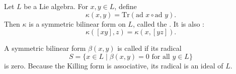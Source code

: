 Let $L$ be a Lie algebra. For $x, y \in L$, define
$$\kappa(x, y) = \text{Tr}(\text{ad } x \circ \text{ad } y).$$
Then $\kappa$ is a symmetric bilinear form on $L$, called the . It is also :
$$\kappa([xy], z) = \kappa(x, [yz]).$$

A symmetric bilinear form $\beta(x, y)$ is called  if its radical
$$S = \{x \in L \mid \beta(x, y) = 0 \text{ for all } y \in L\}$$
is zero. Because the Killing form is associative, its radical is an ideal of $L$.
